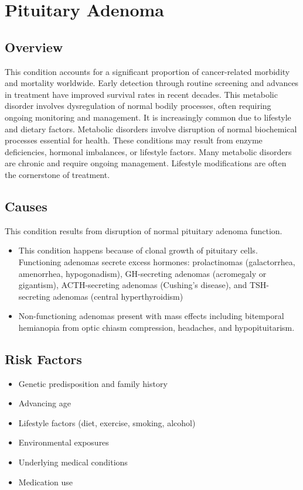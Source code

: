 \chapter{Pituitary Adenoma}
\label{sec:Pituitary Adenoma}

\section{Overview}
This condition accounts for a significant proportion of cancer-related morbidity and mortality worldwide. Early detection through routine screening and advances in treatment have improved survival rates in recent decades. This metabolic disorder involves dysregulation of normal bodily processes, often requiring ongoing monitoring and management. It is increasingly common due to lifestyle and dietary factors. Metabolic disorders involve disruption of normal biochemical processes essential for health. These conditions may result from enzyme deficiencies, hormonal imbalances, or lifestyle factors. Many metabolic disorders are chronic and require ongoing management. Lifestyle modifications are often the cornerstone of treatment.
\section{Causes}
This condition results from disruption of normal pituitary adenoma function.

\begin{itemize}[noitemsep]
  \item This condition happens because of clonal growth of pituitary cells. Functioning adenomas secrete excess hormones: prolactinomas (galactorrhea, amenorrhea, hypogonadism), GH-secreting adenomas (acromegaly or gigantism), ACTH-secreting adenomas (Cushing's disease), and TSH-secreting adenomas (central hyperthyroidism)
  \item Non-functioning adenomas present with mass effects including bitemporal hemianopia from optic chiasm compression, headaches, and hypopituitarism.
\end{itemize}
\section{Risk Factors}
\begin{itemize}[noitemsep]
  \item Genetic predisposition and family history
  \item Advancing age
  \item Lifestyle factors (diet, exercise, smoking, alcohol)
  \item Environmental exposures
  \item Underlying medical conditions
  \item Medication use
\end{itemize}
